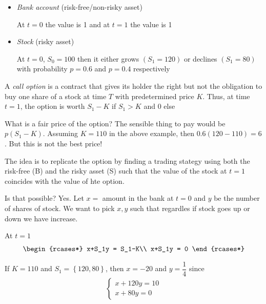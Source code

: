 \begin{itemize}
  \item \textit{Bank account} (risk-free/non-risky asset)\par
    At $t=0$ the value is 1 and at $t=1$ the value is 1\par
  \item \textit{Stock} (risky asset)\par
    At $t=0$, $S_0=100$ then it either grows $(S_1 = 120)$ or declines $(S_1 = 80)$ with probability $p=0.6$ and $p= 0.4$ respectively
\end{itemize}
\par\bigskip
\begin{defo}{}
  A \textit{call option} is a contract that gives its holder the right but not the obligation to buy one share of a stock at time $T$ with predetermined price $K$. Thus, at time $t=1$, the option is worth $S_1-K$ if $S_1>K$ and 0 else
\end{defo}
\par\bigskip
\noindent What is a fair price of the option? The sensible thing to pay would be $p(S_1-K)$. Assuming $K = 110$ in the above example, then $0.6(120-110) = 6$. But this is not the best price!
\par\bigskip
\noindent The idea is to replicate the option by finding a trading stategy using both the risk-free (B) and the risky asset (S) such that the value of the stock at $t=1$ coincides with the value of hte option.\par
\noindent Is that possible? Yes. Let $x = $ amount in the bank at $t=0$ and $y$ be the number of shares of stock. We want to pick $x,y$ such that regardles if stock goes up or down we have increase.\par
\noindent At $t=1$
\begin{equation*}
  \begin{gathered}
    \begin{rcases*}
      x+S_1y = S_1-K\\
      x+S_1y = 0
    \end{rcases*}
  \end{gathered}
\end{equation*}\par
\noindent If $K = 110$ and $S_1 = \left\{120,80\right\}$, then $x = -20$ and $y = \dfrac{1}{4}$ since
\begin{equation*}
  \begin{gathered}
    \begin{cases}
      x+120y = 10\\
      x+80y = 0
    \end{cases}
  \end{gathered}
\end{equation*}\par
